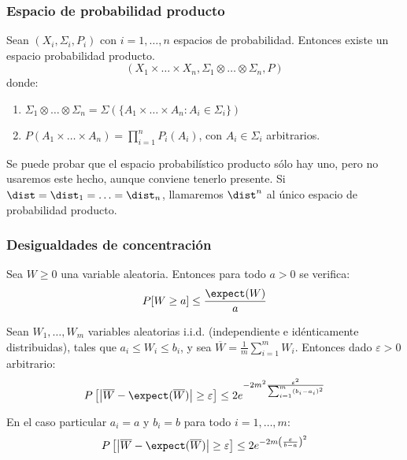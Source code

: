  \begin{frame}\frametitle{Espacio de probabilidad producto}
  \begin{theorem}
   Sean $(X_i, \Sigma_i, P_i)$ con $i=1,\ldots, n$ espacios de probabilidad. Entonces existe un espacio probabilidad
   producto.
   \[(X_1 \times \ldots \times X_n, \Sigma_1 \otimes \ldots \otimes \Sigma_n, P)\]
   donde:
   \begin{enumerate}[i]
   \item $\Sigma_1 \otimes \ldots \otimes \Sigma_n = \Sigma\left(\{A_1 \times \ldots \times A_n: A_i\in \Sigma_i\}\right)$
   \item $P(A_1 \times \ldots \times A_n) = \prod_{i=1}^n P_i(A_i)$, con $A_i\in \Sigma_i$ arbitrarios.
  \end{enumerate}
  \end{theorem}
  
  Se puede probar que el espacio probabilístico producto sólo hay uno, pero no usaremos este hecho, aunque conviene tenerlo
  presente. Si $\dist = \dist_1 = \ldots = \dist_n$, llamaremos $\dist^n$ al único espacio de probabilidad producto.
 \end{frame}
 
 \begin{frame}\frametitle{Desigualdades de concentración}
 \begin{lemma}
  Sea $W \ge 0$ una variable aleatoria. Entonces para todo $a > 0$ se verifica:
  \[
    P[W \ge a] \le \frac{\expect(W)}{a}
  \]
  \label{ineq:markov}
 \end{lemma}
  
  \begin{lemma}
   Sean $W_1, \ldots, W_m$ variables aleatorias i.i.d. (independiente e idénticamente distribuidas), tales que 
   $a_i \le W_i \le b_i$, y sea $\overline{W} = \frac{1}{m} \sum_{i=1}^m W_i$. Entonces dado $\varepsilon > 0$ arbitrario:
   \[
     P\left[\left| \overline{W} - \expect(\overline{W}) \right| \ge \varepsilon \right] \le 2e^{-2m^2 \frac{\varepsilon^2}{\sum_{i=1}^m (b_i-a_i)^2}}
   \]
   
   En el caso particular $a_i = a$ y $b_i = b$ para todo $i=1, \ldots, m$:
   \[
     P\left[\left| \overline{W} - \expect(\overline{W}) \right| \ge \varepsilon \right] \le 2e^{-2m \left(\frac{\varepsilon}{b-a}\right)^2}
   \] 
   \label{ineq:hoeffding}
  \end{lemma}
 \end{frame}